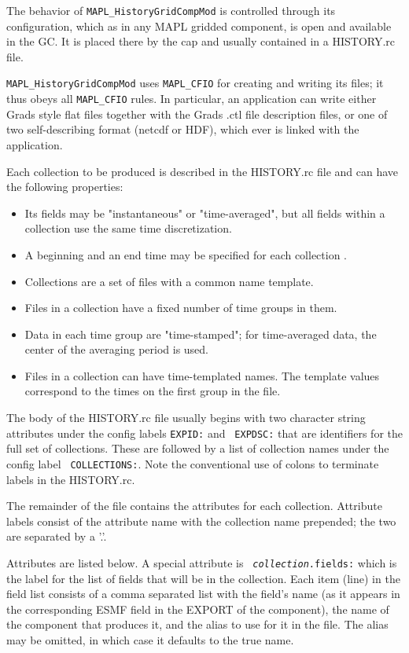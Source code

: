The behavior of {\tt MAPL\_HistoryGridCompMod} is controlled through
its configuration, which as in any MAPL gridded component, is open and
available in the GC. It is placed there by the cap and usually
contained in a HISTORY.rc file.

{\tt MAPL\_HistoryGridCompMod} uses {\tt MAPL\_CFIO} for creating and
writing its files; it thus obeys all {\tt MAPL\_CFIO} rules. In
particular, an application can write either Grads style flat files
together with the Grads .ctl file description files, or one of two
self-describing format (netcdf or HDF), which ever is linked with the
application.

Each collection to be produced is described in the HISTORY.rc file and
can have the following properties:
\begin{itemize}
\item Its fields may be "instantaneous" or "time-averaged", but all fields within
      a collection use the same time discretization. 
\item A beginning and an end time may be specified for each collection .
\item Collections are a set of files with a common name template. 
\item Files in a collection have a fixed number of time groups in them.
\item Data in each time group are "time-stamped"; for time-averaged data,
 the center of the averaging period is used.
\item Files in a collection can have time-templated names. The template
      values correspond to the times on the first group in the file.
\end{itemize}

The body of the HISTORY.rc file usually begins with two character
string attributes under the config labels {\tt EXPID:} and {\tt
  EXPDSC:} that are identifiers for the full set of collections. These
are followed by a list of collection names under the config label {\tt
  COLLECTIONS:}. Note the conventional use of colons to terminate
labels in the HISTORY.rc.

The remainder of the file contains the attributes for each collection.
Attribute labels consist of the attribute name with the collection
name prepended; the two are separated by a '.'.

Attributes are listed below. A special attribute is {\tt {\em
collection}.fields:} which is the label for the list of fields
that will be in the collection.  Each item (line) in the field list
consists of a comma separated list with the field's name (as it
appears in the corresponding ESMF field in the EXPORT of the
component), the name of the component that produces it, and the alias
to use for it in the file. The alias may be omitted, in which case it
defaults to the true name.


